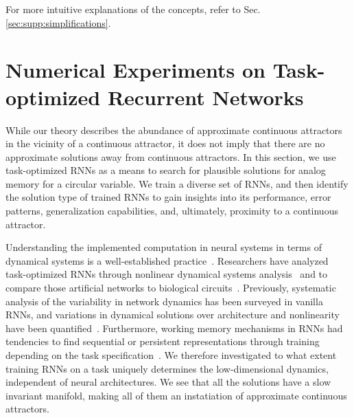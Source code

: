 \documentclass{article} %
\newcounter{ct}
\theoremstyle{definition}
\theoremstyle{remark}
\begin{document}
For more intuitive explanations of the concepts, refer to Sec.\ref{sec:supp:simplifications}.


\section{Numerical Experiments on Task-optimized Recurrent Networks}\label{sec:experiments}

While our theory describes the abundance of approximate continuous attractors in the vicinity of a continuous attractor, it does not imply that there are no approximate solutions away from continuous attractors.
In this section, we use task-optimized RNNs as a means to search for plausible solutions for analog memory for a circular variable.
We train a diverse set of RNNs, and then identify the solution type of trained RNNs to gain insights into its performance, error patterns, generalization capabilities, and, ultimately, proximity to a continuous attractor.

Understanding the implemented computation in neural systems in terms of dynamical systems is a well-established practice~\citep{seung1996,sompolinsky1988}.
Researchers have analyzed task-optimized RNNs through nonlinear dynamical systems analysis~\citep{sussillo2013blackbox,sussillo2014,barak2013,driscoll2022,maheswaranathan2019universality,cueva2019headdirection,cueva2021continuous} and to compare those artificial networks to biological circuits~\citep{mante2013context,remington2018flexible,ghazizadeh2021slow}.
Previously, systematic analysis of the variability in network dynamics has been surveyed in vanilla RNNs, and variations in dynamical solutions over architecture and nonlinearity have been quantified~\citep{sussillo2013blackbox,mante2013context,yang2019task,maheswaranathan2019universality,driscoll2022}.
Furthermore, working memory mechanisms in RNNs had tendencies to find sequential or persistent representations through training depending on the task specification~\citep{orhan2019diverse}.
We therefore investigated to what extent training RNNs on a task uniquely determines the low-dimensional dynamics, independent of neural architectures.
We see that all the solutions have a slow invariant manifold, making all of them an instatiation of approximate continuous attractors.
\end{document}
